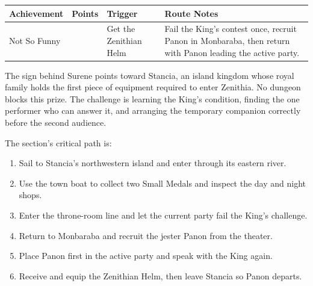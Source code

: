 \documentclass[
  american,
  10pt,
  letterpaper,
  oneside,
  open=any]{scrreprt}
\newcounter{none} %
\providecommand{\tightlist}{%
  \setlength{\itemsep}{0pt}\setlength{\parskip}{0pt}}
\newenvironment{guidetable}{%
  \small\setstretch{1.0}%
  \setlength{\tabcolsep}{4pt}%
  \setlength{\LTpre}{8pt}\setlength{\LTpost}{10pt}%
  \renewcommand{\arraystretch}{1.16}%
}{ }
\begin{document}
\begin{guidetable}

{\def\LTcaptype{none} %
\begin{longtable}[]{@{}
  >{\raggedright\arraybackslash}p{}
  >{\raggedleft\arraybackslash}p{}
  >{\raggedright\arraybackslash}p{}
  >{\raggedright\arraybackslash}p{}@{}}
\toprule\noalign{}
\begin{minipage}[b]{\linewidth}\raggedright
\color{GuideGreen}\bfseries Achievement
\end{minipage} & \begin{minipage}[b]{\linewidth}\raggedleft
\color{GuideGreen}\bfseries Points
\end{minipage} & \begin{minipage}[b]{\linewidth}\raggedright
\color{GuideGreen}\bfseries Trigger
\end{minipage} & \begin{minipage}[b]{\linewidth}\raggedright
\color{GuideGreen}\bfseries Route Notes
\end{minipage} \\
\midrule\noalign{}
\endhead
\bottomrule\noalign{}
\endlastfoot
Not So Funny & 5 & Get the Zenithian Helm & Fail the King's contest
once, recruit Panon in Monbaraba, then return with Panon leading the
active party. \\
\end{longtable}
}

\end{guidetable}

The sign behind Surene points toward Stancia, an island kingdom whose
royal family holds the first piece of equipment required to enter
Zenithia. No dungeon blocks this prize. The challenge is learning the
King's condition, finding the one performer who can answer it, and
arranging the temporary companion correctly before the second audience.

The section's critical path is:

\begin{enumerate}
\def\labelenumi{\arabic{enumi}.}
\tightlist
\item
  Sail to Stancia's northwestern island and enter through its eastern
  river.
\item
  Use the town boat to collect two Small Medals and inspect the day and
  night shops.
\item
  Enter the throne-room line and let the current party fail the King's
  challenge.
\item
  Return to Monbaraba and recruit the jester Panon from the theater.
\item
  Place Panon first in the active party and speak with the King again.
\item
  Receive and equip the Zenithian Helm, then leave Stancia so Panon
  departs.
\end{enumerate}
\end{document}
